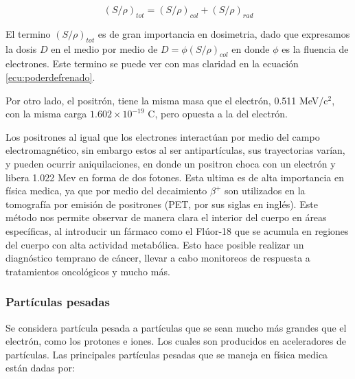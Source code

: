 \documentclass[onecolumn,12pt]{article} %
\begin{document}
\begin{equation*}
    (S/\rho)_{tot}=(S/\rho)_{col}+(S/\rho)_{rad}
\end{equation*}

El termino $(S/\rho)_{tot}$ es de gran importancia en  dosimetria, dado que expresamos la dosis $D$ en el medio por medio de $D=\phi(S/\rho)_{col}$ en donde $\phi$ es la fluencia de electrones. Este termino se puede ver con mas claridad en la ecuación \ref{ecu:poderdefrenado}. 
 



Por otro lado, el positrón, tiene la misma masa que el electrón, 0.511 MeV/c\(^2\), con la misma carga \(1.602 \times 10^{-19}\) C, pero opuesta a la del electrón. 

Los positrones al igual que los electrones interactúan por medio del campo electromagnético, sin embargo estos  al ser antipartículas, sus trayectorias  varían,  y pueden ocurrir aniquilaciones, en donde un positron choca con un electrón y libera 1.022 Mev en forma de dos fotones. Esta ultima es de alta importancia en física medica, ya que por medio del  decaimiento \(\beta^+\) son utilizados en la tomografía por emisión de positrones (PET, por sus siglas en inglés). Este método nos permite observar de manera clara el interior del cuerpo en áreas específicas, al introducir un fármaco como el Flúor-18 que se acumula en regiones del cuerpo con alta actividad metabólica. Esto hace posible realizar un diagnóstico temprano de cáncer, llevar a cabo monitoreos de respuesta a tratamientos oncológicos y mucho más. 







\subsubsection*{Partículas pesadas}
Se considera partícula pesada a partículas que se sean mucho más grandes que el electrón, como los protones e iones. Los cuales son producidos en aceleradores de partículas. Las principales partículas pesadas que se maneja en física medica están dadas por:
\end{document}

